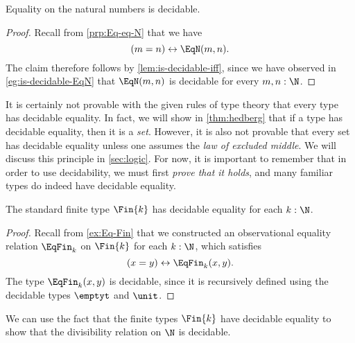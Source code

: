 \begin{prp}\label{prp:has-decidable-equality-N}
  Equality on the natural numbers is decidable.
\end{prp}

\begin{proof}
  Recall from \cref{prp:Eq-eq-N} that we have
  \begin{equation*}
    (m=n)\leftrightarrow \EqN(m,n).
  \end{equation*}
  The claim therefore follows by \cref{lem:is-decidable-iff}, since we have observed in \cref{eg:is-decidable-EqN} that $\EqN(m,n)$ is decidable for every $m,n:\N$.
\end{proof}

It is certainly not provable with the given rules of type theory that every type has decidable equality. In fact, we will show in \cref{thm:hedberg} that if a type has decidable equality, then it is a \emph{set}. However, it is also not provable that every set has decidable equality unless one assumes the \emph{law of excluded middle}. We will discuss this principle in \cref{sec:logic}. For now, it is important to remember that in order to use decidability, we must first \emph{prove that it holds}, and many familiar types do indeed have decidable equality.

\begin{prp}\label{prp:has-decidable-equality-Fin}
  The standard finite type $\Fin{k}$ has decidable equality for each $k:\N$.
\end{prp}

\begin{proof}
  Recall from \cref{ex:Eq-Fin} that we constructed an observational equality relation $\EqFin_k$ on $\Fin{k}$ for each $k:\N$, which satisfies
  \begin{equation*}
    (x=y)\leftrightarrow \EqFin_k(x,y).
  \end{equation*}
  The type $\EqFin_k(x,y)$ is decidable, since it is recursively defined using the decidable types $\emptyt$ and $\unit$.
\end{proof}

We can use the fact that the finite types $\Fin{k}$ have decidable equality to show that the divisibility relation on $\N$ is decidable. 

